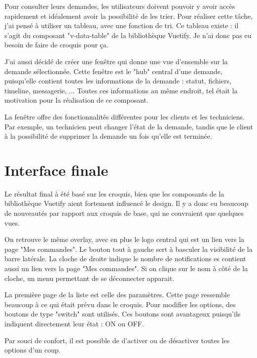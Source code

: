 \documentclass[
    iai, %
    eai, %
]{heig-tb}
\begin{document}

\newpage
Pour consulter leurs demandes, les utilisateurs doivent pouvoir y avoir accès rapidement et idéalement avoir la possibilité de les trier.
Pour réaliser cette tâche, j'ai pensé à utiliser un tableau, avec une fonction de tri.
Ce tableau existe : il s'agit du composant "v-data-table" de la bibliothèque Vuetify.
Je n'ai donc pas eu besoin de faire de croquis pour ça.

J'ai aussi décidé de créer une fenêtre qui donne une vue d'ensemble sur la demande sélectionnée.
Cette fenêtre est le "hub" central d'une demande, puisqu'elle contient toutes les informations de la demande : statut, fichiers, timeline, messagerie, ...
Toutes ces informations au même endroit, tel était la motivation pour la réalisation de ce composant.


La fenêtre offre des fonctionnalités différentes pour les clients et les techniciens.
Par exemple, un technicien peut changer l'état de la demande, tandis que le client à la possibilité de supprimer la demande un fois qu'elle est terminée.

\newpage
\section{Interface finale}
Le résultat final à été basé sur les croquis, bien que les composants de la bibliothèque Vuetify aient fortement influencé le design.
Il y a donc eu beaucoup de nouveautés par rapport aux croquis de base, qui ne couvraient que quelques vues.

On retrouve le même overlay, avec en plus le logo central qui est un lien vers la page "Mes commandes".
Le bouton tout à gauche sert à basculer la visibilité de la barre latérale.
La cloche de droite indique le nombre de notifications es contient aussi un lien vers la page "Mes commandes".
Si on clique sur le nom à côté de la cloche, un menu permettant de se déconnecter apparait.

La première page de la liste est celle des paramètres.
Cette page ressemble beaucoup à ce qui était prévu dans le croquis.
Pour modifier les options, des boutons de type "switch" sont utilisés.
Ces boutons sont avantageux puisqu'ils indiquent directement leur état : ON ou OFF.

Par souci de confort, il est possible de d'activer ou de désactiver toutes les options d'un coup.
\end{document}
